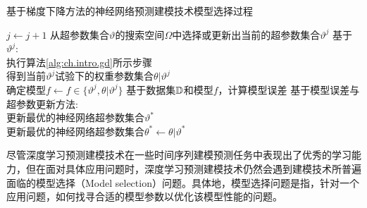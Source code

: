 \begin{algorithm}[t!]
    \caption{基于梯度下降方法的神经网络预测建模技术模型选择过程}
    \renewcommand{\algorithmcfname}{算法}
    \renewcommand{\algorithmicrequire}{\textbf{输入:}}
    \renewcommand{\algorithmicensure}{\textbf{输出:}}
    \label{alg:ch.intro.ms}
    \begin{algorithmic}[1]
        \STATE \(j\leftarrow j+1\)
        \STATE 从超参数集合\(\vartheta\)的搜索空间\(\Omega\)中选择或更新出当前的超参数集合\(\vartheta^j\)
        \STATE 基于\(\vartheta^j\):\\
        \hspace{2em}执行算法\ref{alg:ch.intro.gd}所示步骤\\
        \hspace{2em}得到当前\(\vartheta^j\)试验下的权重参数集合\(\theta|\vartheta^j\)\\
        \hspace{2em}确定模型\(f \leftarrow  f \in \{\vartheta^j, \theta|\vartheta^j\}\)
        \STATE 基于数据集\(\mathbb{D}\)和模型\(f\)，计算模型误差
        \STATE 基于模型误差与超参数更新方法:\\
        \hspace{2em}更新最优的神经网络超参数集合\(\vartheta^*\)\\
        \hspace{2em}更新最优的神经网络超参数集合\(\theta^* \leftarrow  \theta|\vartheta^*\)
        \ENDWHILE
    \end{algorithmic}
\end{algorithm}
尽管深度学习预测建模技术在一些时间序列建模预测任务中表现出了优秀的学习能力，但在面对具体应用问题时，深度学习预测建模技术仍然会遇到建模技术所普遍面临的模型选择（Model selection）问题。具体地，模型选择问题是指，针对一个应用问题，如何找寻合适的模型参数以优化该模型性能的问题\cite{guyonModel2010,hastieElements2009,escalanteParticle2009}。

